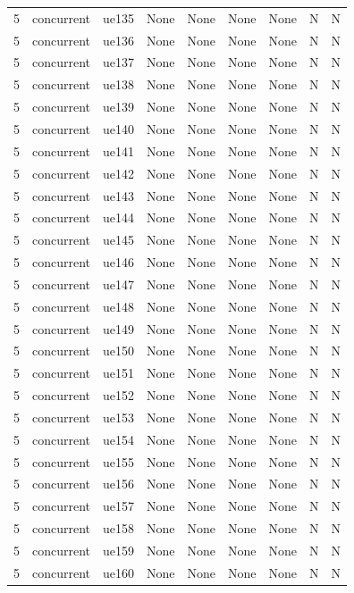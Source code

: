 \begin{table}[ht]
\begin{tabular}{|c|c|c|c|c|c|c|c|c|}
5 & concurrent & ue135 & None & None & None & None & N & N \\
5 & concurrent & ue136 & None & None & None & None & N & N \\
5 & concurrent & ue137 & None & None & None & None & N & N \\
5 & concurrent & ue138 & None & None & None & None & N & N \\
5 & concurrent & ue139 & None & None & None & None & N & N \\
5 & concurrent & ue140 & None & None & None & None & N & N \\
5 & concurrent & ue141 & None & None & None & None & N & N \\
5 & concurrent & ue142 & None & None & None & None & N & N \\
5 & concurrent & ue143 & None & None & None & None & N & N \\
5 & concurrent & ue144 & None & None & None & None & N & N \\
5 & concurrent & ue145 & None & None & None & None & N & N \\
5 & concurrent & ue146 & None & None & None & None & N & N \\
5 & concurrent & ue147 & None & None & None & None & N & N \\
5 & concurrent & ue148 & None & None & None & None & N & N \\
5 & concurrent & ue149 & None & None & None & None & N & N \\
5 & concurrent & ue150 & None & None & None & None & N & N \\
5 & concurrent & ue151 & None & None & None & None & N & N \\
5 & concurrent & ue152 & None & None & None & None & N & N \\
5 & concurrent & ue153 & None & None & None & None & N & N \\
5 & concurrent & ue154 & None & None & None & None & N & N \\
5 & concurrent & ue155 & None & None & None & None & N & N \\
5 & concurrent & ue156 & None & None & None & None & N & N \\
5 & concurrent & ue157 & None & None & None & None & N & N \\
5 & concurrent & ue158 & None & None & None & None & N & N \\
5 & concurrent & ue159 & None & None & None & None & N & N \\
5 & concurrent & ue160 & None & None & None & None & N & N \\

\end{tabular}
\end{table}
